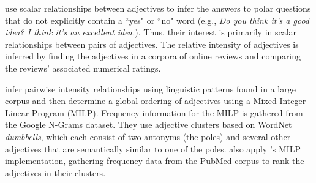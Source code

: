 \documentclass[11pt,a4paper]{article}
\begin{document}
 use scalar relationships between adjectives to infer the answers to polar questions that do not explicitly contain a ``yes" or ``no" word (e.g., \textit{Do you think it's a good idea? I think it's an excellent idea.}). Thus, their interest is primarily in scalar relationships between pairs of adjectives. The relative intensity of adjectives is inferred by finding the adjectives in a corpora of online reviews and comparing the reviews' associated numerical ratings. 

 infer pairwise intensity relationships using linguistic patterns found in a large corpus and then determine a global ordering of adjectives using a Mixed Integer Linear Program (MILP). Frequency information for the MILP is gathered from the Google N-Grams dataset. They use adjective clusters based on WordNet \textit{dumbbells}, which each consist of two antonyms (the poles) and several other adjectives that are semantically similar to one of the poles.  also apply 's MILP implementation, gathering frequency data from the PubMed corpus to rank the adjectives in their clusters. 












\end{document}
